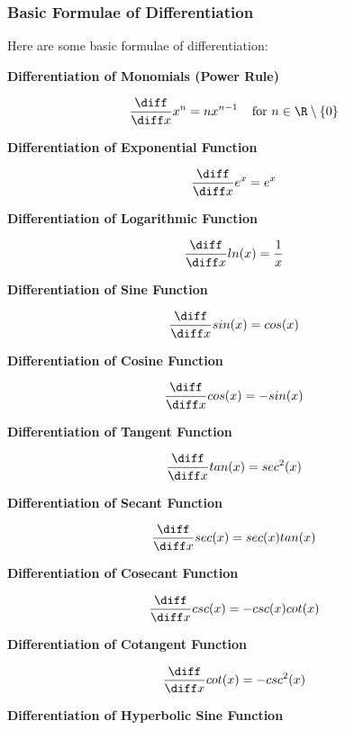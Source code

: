 \subsubsection{Basic Formulae of Differentiation}
\begin{thm}
  Here are some basic formulae of differentiation:

  \begin{alist}
    \item \textbf{Differentiation of Monomials (Power Rule)}

    $$\frac{\diff }{\diff  x}x^{n}=nx^{n-1}\;\;\;\;\text{for }n\in\R\setminus \left\{ 0\right\}$$

    \item \textbf{Differentiation of Exponential Function}

    $$\frac{\diff }{\diff  x}e^{x}=e^{x}$$

    \item \textbf{Differentiation of Logarithmic Function}

    $$\frac{\diff }{\diff  x}ln(x)=\frac{1}{x}$$

    \item \textbf{Differentiation of Sine Function}

    $$\frac{\diff }{\diff  x}sin(x)=cos(x)$$

    \item \textbf{Differentiation of Cosine Function}

    $$\frac{\diff }{\diff  x}cos(x)=-sin(x)$$

    \item \textbf{Differentiation of Tangent Function}

    $$\frac{\diff }{\diff  x}tan(x)=sec^{2}(x)$$

    \item \textbf{Differentiation of Secant Function}

    $$\frac{\diff }{\diff  x}sec(x)=sec(x)tan(x)$$

    \item \textbf{Differentiation of Cosecant Function}

    $$\frac{\diff }{\diff  x}csc(x)=-csc(x)cot(x)$$

    \item \textbf{Differentiation of Cotangent Function}

    $$\frac{\diff }{\diff  x}cot(x)=-csc^{2}(x)$$

    \item \textbf{Differentiation of Hyperbolic Sine Function}


\end{alist}
\end{thm}
